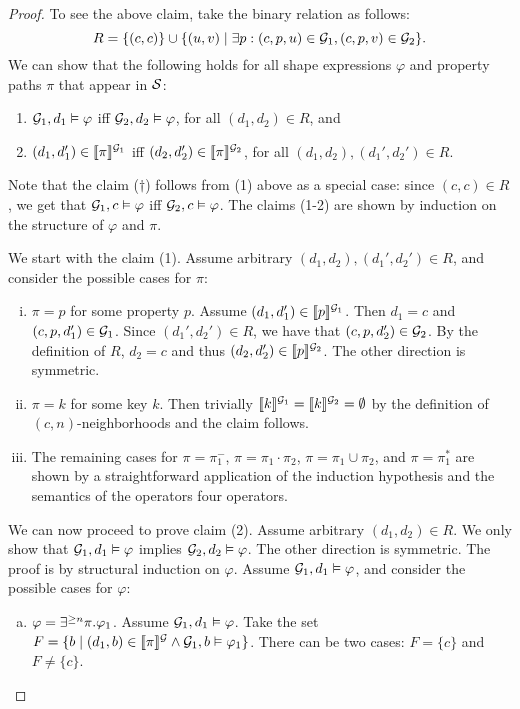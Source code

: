\begin{proof}
To see the above claim, take the binary relation as follows:
\[R=\{(c,c)\}\cup \{(u,v)\mid \exists p: (c,p,u)\in \mathcal{G}_1,(c,p,v)\in \mathcal{G}_2 \}.\] 
We can show  that the following holds for all shape expressions $\varphi$ and property paths $\pi$ that appear in $\mathcal{S}$:
\begin{enumerate}
    \item $\mathcal{G}_1,d_1\vDash \varphi$ iff $\mathcal{G}_2,d_2\vDash \varphi$, for all $(d_1,d_2)\in R$, and 
    \item $(d_1,d_1')\in \llbracket{\pi}\rrbracket^{\mathcal{G}_1}$ iff $(d_2,d_2')\in \llbracket{\pi}\rrbracket^{\mathcal{G}_2}$, for all $(d_1,d_2),(d_1',d_2')\in R$.
\end{enumerate}
Note that the claim ($\dagger$) follows from (1) above as a special case: since $(c,c)\in R$, we get that $\mathcal{G}_1,c\vDash \varphi$ iff $\mathcal{G}_2,c\vDash \varphi$. The claims (1-2) are shown by induction on the structure of $\varphi$ and $\pi$. 

We start with the claim (1). Assume arbitrary $(d_1,d_2),(d_1',d_2')\in R$, and consider the possible cases for $\pi$:
\begin{enumerate}[(i)]
    \item $\pi=p$ for some property $p$. Assume  $(d_1,d_1')\in \llbracket{p}\rrbracket^{\mathcal{G}_1}$. Then $d_1=c$ and $(c,p,d_1')\in \mathcal{G}_1$. Since $(d_1',d_2')\in R$, we have that $(c,p,d_2')\in \mathcal{G}_2$. By the definition of $R$, $d_2=c$ and thus $(d_2,d_2')\in\llbracket{p}\rrbracket^{\mathcal{G}_2}$. The other direction is symmetric.
    \item $\pi=k$ for some key $k$. Then trivially $\llbracket{k}\rrbracket^{\mathcal{G}_1}=\llbracket{k}\rrbracket^{\mathcal{G}_2}=\emptyset$  by the definition of $(c,n)$-neighborhoods and the claim follows.
   
   \item The remaining cases for $\pi=\pi_1^{-}$, $\pi=\pi_1\cdot \pi_2$, $\pi=\pi_1\cup \pi_2$, and $\pi=\pi_1^{*}$ are shown by a straightforward application of the induction hypothesis and the semantics of the operators four operators. 
\end{enumerate}

We can now proceed to prove claim (2).  Assume arbitrary $(d_1,d_2)\in R$. We only show that  $\mathcal{G}_1,d_1\vDash \varphi$ implies $\mathcal{G}_2,d_2\vDash \varphi$. The other direction is symmetric. The proof is by structural induction on $\varphi$. Assume $\mathcal{G}_1,d_1\vDash \varphi$, and consider the possible cases for $\varphi$:
\begin{enumerate}[(a)]
  \item $\varphi = \exists^{\geq n}\pi.{\varphi_1}$. Assume  $\mathcal{G}_1,d_1\vDash \varphi$. Take the set $F=\{b\mid (d_1,b) \in \llbracket \pi \rrbracket^{\mathcal{G}} \land\mathcal{G}_1,b\vDash\varphi_1 \}$. There can be two cases: $F=\{c\}$ and $F\neq \{c\}$.


\end{enumerate}
\end{proof}
